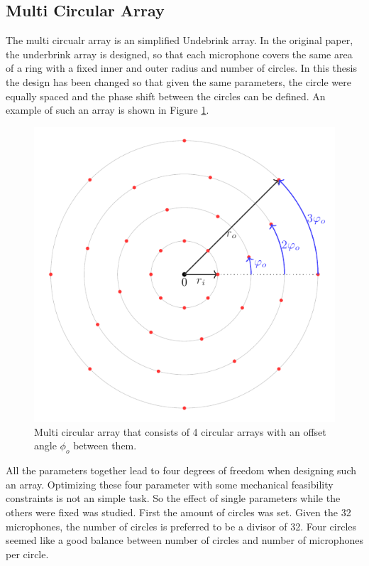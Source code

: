 \subsection{Multi Circular Array}
The multi circualr array is an simplified Undebrink array.
In the original paper, the underbrink array is designed, so that each
microphone covers the same area of a ring with a fixed inner and outer radius and number of circles.
In this thesis the design has been changed so that given the same parameters,
the circle were equally spaced and the phase shift between the circles can be defined.
An example of such an array is shown in Figure \ref*{aev:fig:FancyArr}.
\begin{figure}[h]
	\centering
	\includegraphics[]{images/5_array_evaluation/fancy_arr.pdf}
	\caption{Multi circular array that consists of 4 circular arrays
	with an offset angle $\phi_o$ between them.}
	\label{aev:fig:FancyArr}
\end{figure}

All the parameters together lead to four degrees of freedom when designing such an array.
Optimizing these four parameter with some mechanical feasibility constraints is not an simple task.
So the effect of single parameters while the others were fixed was studied.
First the amount of circles was set.
Given the 32 microphones, the number of circles is preferred to be a divisor 
of 32.
Four circles seemed like a good balance between number of circles and number of microphones
per circle.

